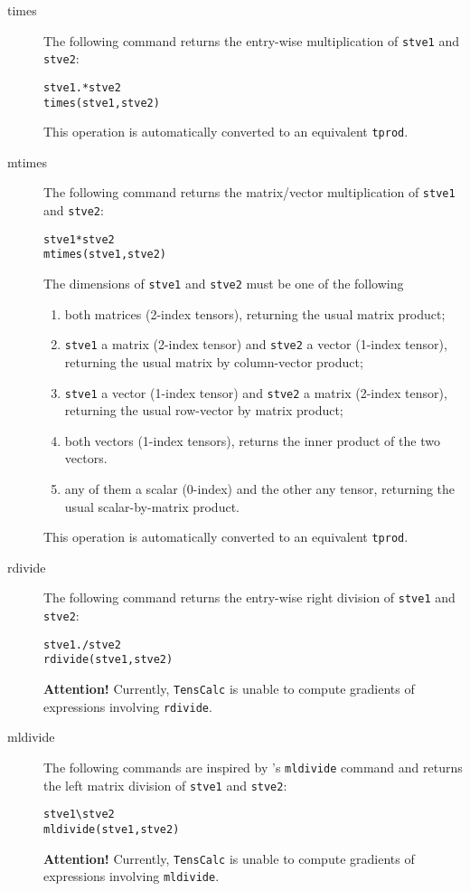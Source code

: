 \documentclass[11pt]{article}
\newcommand{\TC}{\texttt{TensCalc}}
\theoremstyle{remark}
\begin{document}
\begin{description}
\item[times] The following command returns the entry-wise
  multiplication of \lstinline{stve1} and \lstinline{stve2}:
\begin{lstlisting}
stve1.*stve2
times(stve1,stve2)
\end{lstlisting}
This operation is automatically converted to an equivalent \lstinline{tprod}.

\item[mtimes] The following command returns the matrix/vector
  multiplication of \lstinline{stve1} and \lstinline{stve2}:
\begin{lstlisting}
stve1*stve2
mtimes(stve1,stve2)
\end{lstlisting}
The dimensions of \lstinline{stve1} and \lstinline{stve2} must be one of the following
\begin{enumerate}
\item both matrices (2-index tensors), returning the usual matrix product;
\item \lstinline{stve1} a matrix (2-index tensor) and
  \lstinline{stve2} a vector (1-index tensor), returning the usual
  matrix by column-vector product;
\item \lstinline{stve1} a vector (1-index tensor) and
  \lstinline{stve2} a matrix (2-index tensor), returning the usual
  row-vector by matrix product;
\item both vectors (1-index tensors), returns the inner product of
  the two vectors.
\item any of them a scalar (0-index) and the other any tensor,
  returning the usual scalar-by-matrix product.
\end{enumerate}

This operation is automatically converted to an equivalent \lstinline{tprod}.

\item[rdivide] The following command returns the entry-wise
  right division of \lstinline{stve1} and \lstinline{stve2}:
\begin{lstlisting}
stve1./stve2
rdivide(stve1,stve2)
\end{lstlisting}
  \textbf{Attention!} Currently, \TC{} is unable to compute gradients
  of expressions involving \lstinline{rdivide}.
 
\item[mldivide] The following commands are inspired by \matlab's
  \lstinline{mldivide} command and returns the left matrix division of
  \lstinline{stve1} and \lstinline{stve2}:
\begin{lstlisting}
stve1\stve2
mldivide(stve1,stve2)
\end{lstlisting}
  \textbf{Attention!} Currently, \TC{} is unable to compute gradients
  of expressions involving \lstinline{mldivide}.
\end{description}
\end{document}

